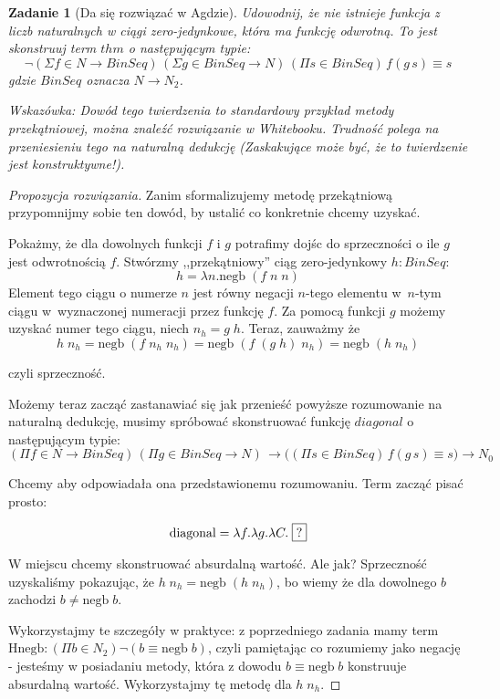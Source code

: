 \documentclass[11pt, a4paper]{article}
\newtheorem{zadanie}{Zadanie}
\begin{document}
\begin{zadanie}[Da się rozwiązać w Agdzie]
 Udowodnij, że nie istnieje funkcja z liczb naturalnych w ciągi zero-jedynkowe, która ma funkcję odwrotną.
To jest skonstruuj
 term $thm$ o następującym typie:
\[
 \neg (\Sigma f \in N \to BinSeq)\, (\Sigma g \in BinSeq \to N)\,
(\Pi s \in BinSeq)\,f (g\, s) \equiv s 
\]
gdzie $BinSeq$ oznacza $N \to N_2$.

Wskazówka: Dowód tego twierdzenia to standardowy przykład metody przekątniowej, można znaleźć rozwiązanie w Whitebooku.
Trudność polega na przeniesieniu tego na naturalną dedukcję (Zaskakujące może być, że to twierdzenie jest konstruktywne!).

\end{zadanie}

\begin{proof}[Propozycja rozwiązania]
Zanim sformalizujemy metodę przekątniową przypomnijmy sobie ten dowód, by ustalić co konkretnie chcemy uzyskać.

Pokażmy, że dla dowolnych funkcji $f$ i $g$ potrafimy dojśc do sprzeczności o ile $g$ jest odwrotnością $f$.
Stwórzmy ,,przekątniowy'' ciąg zero-jedynkowy $h : BinSeq$:
\[
 h = \lambda n. \mbox{negb}\;(f\;n\;n)
\]
Element tego ciągu o numerze $n$ jest równy negacji $n$-tego elementu w~$n$-tym ciągu w~wyznaczonej numeracji
przez funkcję $f$. Za pomocą funkcji $g$ możemy uzyskać numer tego ciągu, niech $n_h = g\;h$. Teraz, zauważmy że
\[
h\;n_h = \mbox{negb}\;(f\;n_h\;n_h) = \mbox{negb}\;(f\;(g\;h)\;n_h) = \mbox{negb}\;(h \;n_h)
\]

czyli sprzeczność.


Możemy teraz zacząć zastanawiać się jak przenieść powyższe rozumowanie na naturalną dedukcję, musimy
spróbować skonstruować
funkcję $diagonal$ o następującym typie:
{
\small
\[
 (\Pi f \in N \to BinSeq)\, (\Pi g \in BinSeq \to N)\,
\to
\big(
(\Pi s \in BinSeq)\,f (g\, s) \equiv s 
\big)
\to N_0
\]
}

Chcemy aby odpowiadała ona przedstawionemu rozumowaniu. Term zacząć pisać prosto:

\[
  \mbox{diagonal} = \lambda f.\lambda g. \lambda C.\; \framebox{?}
\]

W miejscu  chcemy skonstruować absurdalną wartość. Ale jak? Sprzeczność uzyskaliśmy
pokazując, że $h\;n_h = \mbox{negb}\; (h\;n_h)$, bo wiemy że dla dowolnego $b$ zachodzi $b \not= \mbox{negb}\;b$.

Wykorzystajmy te szczegóły w praktyce: z poprzedniego zadania mamy term
$\mbox{Hnegb} : (\Pi b \in N_2) \neg (b \equiv \mbox{negb}\;b)$, czyli pamiętając co rozumiemy
jako negację - jesteśmy w posiadaniu metody, która z dowodu $b \equiv \mbox{negb}\;b$ konstruuje
absurdalną wartość. Wykorzystajmy tę metodę dla $h\;n_h$.


\end{proof}
\end{document}
